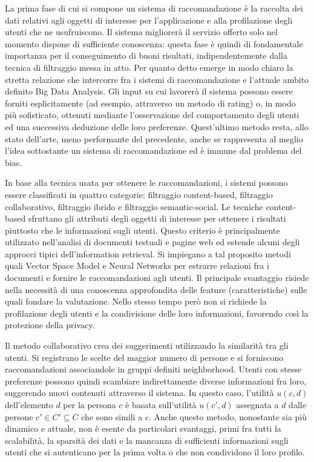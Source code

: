 \documentclass[Lau,binding=0.6cm,noexaminfo,oneside]{sapthesis}
\begin{document}
\medskip

La prima fase di cui si compone un sistema di raccomandazione è la raccolta dei dati relativi agli oggetti di interesse per l'applicazione e alla profilazione degli utenti che ne usufruiscono. Il sistema migliorerà il servizio offerto solo nel momento dispone di sufficiente conoscenza: questa fase è quindi di fondamentale importanza per il conseguimento di buoni risultati, indipendentemente dalla tecnica di filtraggio messa in atto. Per quanto detto emerge in modo chiaro la stretta relazione che intercorre fra i sistemi di raccomandazione e l'attuale ambito definito Big Data Analysis.
Gli input su cui lavorerà il sistema possono essere forniti esplicitamente (ad esempio, attraverso un metodo di rating) o, in modo più sofisticato, ottenuti mediante l'osservazione del comportamento degli utenti ed una successiva deduzione delle loro preferenze. Quest'ultimo metodo resta, allo stato dell'arte, meno performante del precedente, anche se rappresenta al meglio l'idea sottostante un sistema di raccomandazione ed è immune dal problema del bias.\medskip

In base alla tecnica usata per ottenere le raccomandazioni, i sistemi possono essere classificati in quattro categorie: filtraggio content-based, filtraggio collaborativo, filtraggio ibrido e filtraggio semantic-social. Le tecniche content-based sfruttano gli attributi degli oggetti di interesse per ottenere i risultati piuttosto che le informazioni sugli utenti.
Questo criterio è principalmente utilizzato nell'analisi di documenti testuali e pagine web ed estende alcuni degli approcci tipici dell'information retrieval. Si impiegano a tal proposito metodi quali Vector Space Model e Neural Networks per estrarre relazioni fra i documenti e fornire le raccomandazioni agli utenti. Il principale svantaggio risiede nella necessità di una conoscenza approfondita delle feature (caratteristiche) sulle quali fondare la valutazione. Nello stesso tempo però non si richiede la profilazione degli utenti e la condivisione delle loro informazioni, favorendo così la protezione della privacy.\medskip

Il metodo collaborativo crea dei suggerimenti utilizzando la similarità tra gli utenti. Si registrano le scelte del maggior numero di persone e si forniscono raccomandazioni associandole in gruppi definiti neighborhood. Utenti con stesse preferenze possono quindi scambiare indirettamente diverse informazioni fra loro, suggerendo nuovi contenuti attraverso il sistema.
In questo caso, l'utilità $u(c,d)$ dell'elemento $d$ per la persona $c$ è basata sull'utilità $u(c',d)$ assegnata a $d$ dalle persone $c' \in C' \subseteq C$ che sono simili a $c$. Anche questo metodo, nonostante sia più dinamico e attuale, non è esente da particolari svantaggi, primi fra tutti la scalabilità, la sparsità dei dati e la mancanza di sufficienti informazioni sugli utenti che si autenticano per la prima volta o che non condividono il loro profilo.\medskip
\end{document}

